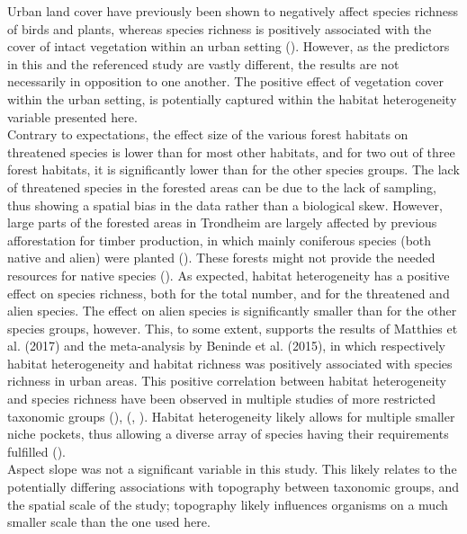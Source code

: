 \documentclass{article}
\begin{document}
Urban land cover have previously been shown to negatively affect species richness of birds and plants, whereas species richness is positively associated with the cover of intact vegetation within an urban setting (\cite{Aronson2014}). However, as the predictors in this and the referenced study are vastly different, the results are not necessarily in opposition to one another. The positive effect of vegetation cover within the urban setting, is potentially captured within the habitat heterogeneity variable presented here.\\
Contrary to expectations, the effect size of the various forest habitats on threatened species is lower than for most other habitats, and for two out of three forest habitats, it is significantly lower than for the other species groups.
The lack of threatened species in the forested areas can be due to the lack of sampling, thus showing a spatial bias in the data rather than a biological skew. However, large parts of the forested areas in Trondheim are largely affected by previous afforestation for timber production, in which mainly coniferous species (both native and alien) were planted (\cite{Presto2005}). These forests might not provide the needed resources for native species (\cite{Brockerhoff2008}).
As expected, habitat heterogeneity has a positive effect on species richness, both for the total number, and for the threatened and alien species. The effect on alien species is significantly smaller than for the other species groups, however. This, to some extent, supports the results of Matthies et al. (2017) and the meta-analysis by Beninde et al. (2015), in which respectively habitat heterogeneity and habitat richness was positively associated with species richness in urban areas.
This positive correlation between habitat heterogeneity  and species richness have been observed in multiple studies of more restricted taxonomic groups (\cite{Sattler2010}), (\cite{Deutschewitz2003}, \cite{Matthies2017}).   %
Habitat heterogeneity likely allows for multiple smaller niche pockets, thus allowing a diverse array of species having their requirements fulfilled (\cite{Tews2004}).\\ %
Aspect slope was not a significant variable in this study. This likely relates to the potentially differing associations with topography between taxonomic groups, and the spatial scale of the study; topography likely influences organisms on a much smaller scale than the one used here.\\
 
\end{document}
